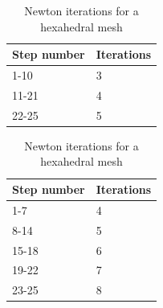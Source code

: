 \begin{table}[!htbp]
\parbox{.45\linewidth}{
\centering
\begin{tabular}{ | l | l |}
\hline
\textbf{Step number} & \textbf{Iterations} \\ \hline
1-10 & 3 \\ \hline
11-21 & 4 \\ \hline
22-25 & 5 \\ \hline
\end{tabular}
\caption{Newton iterations for a tetrahedral mesh}
\label{table:default_tet}
}
\hfill
\parbox{.45\linewidth}{
\centering
\begin{tabular}{ | l | l |}
\hline
\textbf{Step number} & \textbf{Iterations} \\ \hline
1-7 & 4 \\ \hline
8-14 & 5 \\ \hline
15-18 & 6 \\ \hline
19-22 & 7 \\ \hline
23-25 & 8 \\ \hline
\end{tabular}
\caption{Newton iterations for a hexahedral mesh}
\label{table:default_hex}
}
\end{table}

